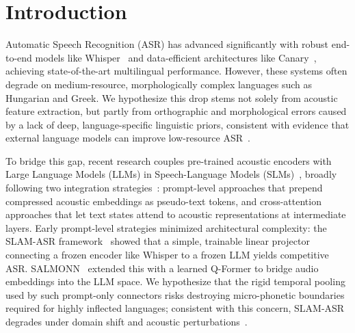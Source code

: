 \documentclass{article}
\begin{document}
\section{Introduction}
\label{sec:intro}
\noindent
Automatic Speech Recognition (ASR) has advanced significantly with robust end-to-end models like Whisper~\cite{radford2022robustspeechrecognitionlargescale} and data-efficient architectures like Canary~\cite{sekoyan2025canary1bv2parakeettdt06bv3efficient}, achieving state-of-the-art multilingual performance. However, these systems often degrade on medium-resource, morphologically complex languages such as Hungarian and Greek. We hypothesize this drop stems not solely from acoustic feature extraction, but partly from orthographic and morphological errors caused by a lack of deep, language-specific linguistic priors, consistent with evidence that external language models can improve low-resource ASR~\cite{dezuazo2025whisperlmimprovingasrmodels}.

To bridge this gap, recent research couples pre-trained acoustic encoders with Large Language Models (LLMs) in Speech-Language Models (SLMs)~\cite{fong2026speechllmslowresourcescenarios}, broadly following two integration strategies~\cite{chen2024bestow}: prompt-level approaches that prepend compressed acoustic embeddings as pseudo-text tokens, and cross-attention approaches that let text states attend to acoustic representations at intermediate layers. Early prompt-level strategies minimized architectural complexity: the SLAM-ASR framework~\cite{ma2024embarrassinglysimpleapproachllm} showed that a simple, trainable linear projector connecting a frozen encoder like Whisper to a frozen LLM yields competitive ASR. SALMONN~\cite{tang2024salmonngenerichearingabilities} extended this with a learned Q-Former to bridge audio embeddings into the LLM space. We hypothesize that the rigid temporal pooling used by such prompt-only connectors risks destroying micro-phonetic boundaries required for highly inflected languages; consistent with this concern, SLAM-ASR degrades under domain shift and acoustic perturbations~\cite{kumar2025performanceevaluationslamasrgood}.
\end{document}
